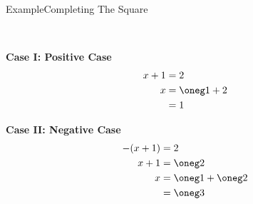 \documentclass[aspectratio=169, sectionpages]{beamer}
\begin{document}
\begin{frame}{Example}{Completing The Square}
	\framebreak

	\hfill\\
	\begin{minipage}[t]{0.45\textwidth}
		\vspace{0pt}
		\textbf{Case I: Positive Case}
		\begin{align*}
			x + 1 & = 2           \\
			x     & = \oneg 1 + 2 \\
			      & = 1
		\end{align*}
	\end{minipage}
	\hspace{0.05\textwidth}
	\begin{minipage}[t]{0.45\textwidth}
		\vspace{0pt}
		\textbf{Case II: Negative Case}
		\begin{align*}
			-(x + 1) & = 2                 \\
			x + 1    & = \oneg 2           \\
			x        & = \oneg 1 + \oneg 2 \\
			         & = \oneg 3
		\end{align*}

	\end{minipage}
	\hfill
\end{frame}
\end{document}
